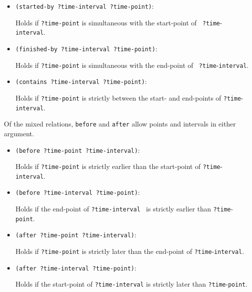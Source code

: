 \begin{itemize}

\item{\verb'(started-by ?time-interval ?time-point)':}

 Holds if {\tt ?time-point} is simultaneous with the start-point of {\tt
 ?time}-{\tt interval}.

\item{\verb'(finished-by ?time-interval ?time-point)':}

 Holds if {\tt ?time-point} is simultaneous with the end-point of {\tt
 ?time}-{\tt interval}.

\item{\verb'(contains ?time-interval ?time-point)':}

 Holds if {\tt ?time-point} is strictly between the start- and end-points of
 {\tt ?time}-{\tt interval}.

\end{itemize}


 Of the mixed relations, {\tt before} and {\tt after} allow points and
intervals in either argument.

\begin{itemize}

\item{\verb'(before ?time-point ?time-interval)':}

  Holds if {\tt ?time-point} is strictly earlier
  than the start-point of {\tt ?time}-{\tt interval}.

\item{\verb'(before ?time-interval ?time-point)':}

  Holds if the end-point of
  {\tt ?time-interval } is strictly earlier than {\tt ?time}-{\tt point}.

\item{\verb'(after ?time-point ?time-interval)':}

  Holds if {\tt ?time-point} is strictly later than the end-point of
  {\tt ?time}-{\tt interval}.

\item{\verb'(after ?time-interval ?time-point)':}

  Holds if the start-point of {\tt ?time-interval} is strictly later than
  {\tt ?time}-{\tt point}.

\end{itemize}

